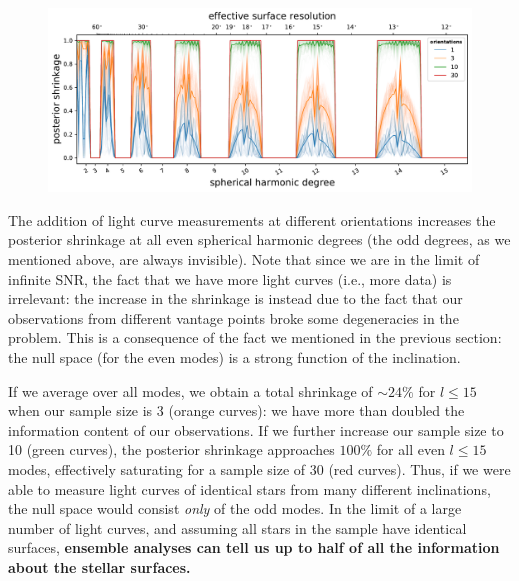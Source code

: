\documentclass[modern]{aastex62}
\begin{document}
\begin{figure}[t!]
    \begin{centering}
        \includegraphics[width=\linewidth]{figures/nullspace_ensemble.pdf}
    \end{centering}
\end{figure}

The addition of light curve measurements at different orientations
increases the posterior shrinkage at all even spherical harmonic degrees
(the odd degrees, as we mentioned above, are always invisible).
Note that since we are in the limit of infinite SNR, the fact that we have
more light curves (i.e., more data) is irrelevant: the
increase in the shrinkage is instead due to the fact that our observations
from different vantage points broke some degeneracies in the problem.
This is a consequence of the fact we mentioned in the previous section:
the null space (for the even modes)
is a strong function of the inclination.

If we average over all modes, we obtain a total shrinkage of $\sim 24\%$
for $l\leq15$ when our sample size is 3 (orange curves): we have more than doubled the
information content of our observations. If we further increase our sample size
to 10 (green curves), the posterior shrinkage approaches $100\%$ for all even $l\leq15$
modes, effectively saturating for a sample size of 30 (red curves).
Thus, if we were able to measure light curves of identical stars
from many different inclinations, the null space would consist \emph{only}
of the odd modes. In the limit of a large number of light curves,
and assuming all stars in the sample have identical surfaces,
\textbf{ensemble analyses can tell us up to
    half of all the information about the stellar surfaces.}
\end{document}
